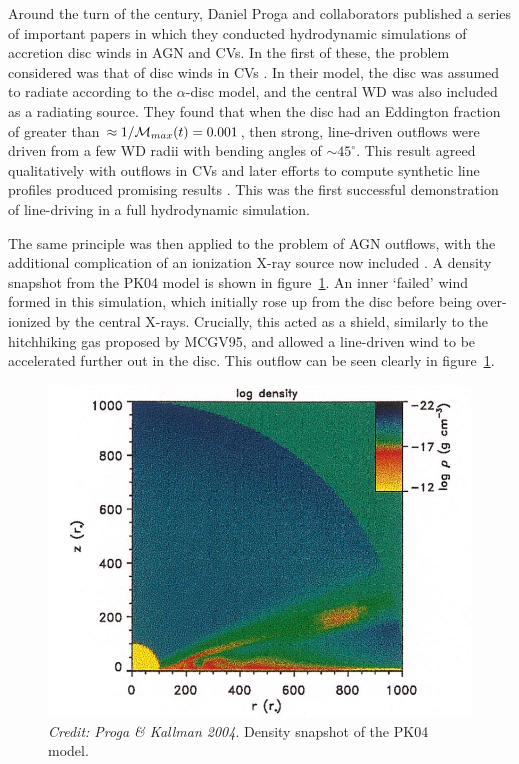 Around the turn of the century, Daniel Proga and collaborators 
published a series of important papers in which they conducted 
hydrodynamic simulations of accretion disc winds in AGN and CVs. 
In the first of these, the problem considered was that of disc
winds in CVs \citep{proga1998}. In their model, the disc was assumed
to radiate according to the $\alpha$-disc model, and the central WD was also included
as a radiating source. They found that when the disc had an Eddington fraction 
of greater than $\approx 1 / {\cal M}_{max} (t) = 0.001$, then strong, line-driven
outflows were driven from a few WD radii with bending angles of $\sim45^\circ$.
This result agreed qualitatively with outflows in CVs and later efforts to compute
synthetic line profiles produced promising results \citep{proga2002}. This was the
first successful demonstration of line-driving in a full hydrodynamic simulation.

The same principle was then applied to the problem of AGN outflows, with the
additional complication of an ionization X-ray source now included 
\citep[][hereafter PK04]{PSK2000,PK04}. A density snapshot from the PK04 model
is shown in figure~\ref{fig:PK04}. An inner `failed' wind formed in this simulation,
which initially rose up from the disc before being over-ionized by the central X-rays.
Crucially, this acted as a shield, similarly to the hitchhiking gas proposed by
MCGV95, and allowed a line-driven wind to be accelerated further out in the disc. 
This outflow can be seen clearly in figure~\ref{fig:PK04}.

\begin{figure}
\centering
\includegraphics[width=1.0\textwidth]{figures/02-outflows/proga2.png}
\caption
{
{\sl Credit: Proga \& Kallman 2004}. 
Density snapshot of the PK04 model.
} 
\label{fig:PK04}
\end{figure}

